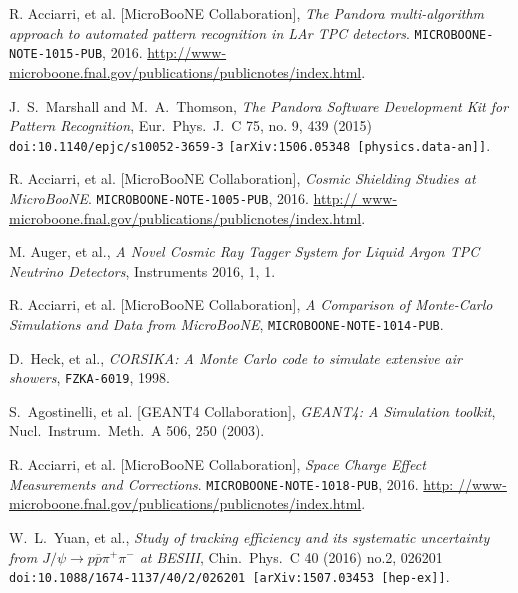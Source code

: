 \documentclass[a4paper]{scrartcl}
\begin{document}
\begin{thebibliography}{9}

   R. Acciarri, et al. [MicroBooNE Collaboration], \textit{The Pandora multi-algorithm approach to automated pattern recognition in LAr TPC detectors}. \texttt{MICROBOONE- NOTE-1015-PUB}, 2016. \url{http://www-microboone.fnal.gov/publications/publicnotes/index.html}.

   J.~S.~Marshall and M.~A.~Thomson, \textit{The Pandora Software Development Kit for Pattern Recognition}, Eur.\ Phys.\ J.\ C 75, no. 9, 439 (2015) \texttt{doi:10.1140/epjc/s10052-3659-3} \texttt{[arXiv:1506.05348 [physics.data-an]]}.

   R. Acciarri, et al. [MicroBooNE Collaboration], \textit{Cosmic Shielding Studies at MicroBooNE}. \texttt{MICROBOONE-NOTE-1005-PUB}, 2016. \url{http:// www-microboone.fnal.gov/publications/publicnotes/index.html}.

   M. Auger, et al., \textit{A Novel Cosmic Ray Tagger System for Liquid Argon TPC Neutrino Detectors}, Instruments 2016, 1, 1.

   R. Acciarri, et al. [MicroBooNE Collaboration], \textit{A Comparison of Monte-Carlo Simulations and Data from MicroBooNE}, \texttt{MICROBOONE-NOTE-1014-PUB}.

   D.~Heck, et al.,
  \textit{CORSIKA: A Monte Carlo code to simulate extensive air showers},
  \texttt{FZKA-6019}, 1998.

   S.~Agostinelli, et al. [GEANT4 Collaboration], \textit{GEANT4: A Simulation toolkit}, Nucl.\ Instrum.\ Meth.\ A {506}, 250 (2003).

   R. Acciarri, et al. [MicroBooNE Collaboration], \textit{Space Charge Effect Measurements and Corrections}. \texttt{MICROBOONE-NOTE-1018-PUB}, 2016. \url{http: //www-microboone.fnal.gov/publications/publicnotes/index.html}.

    W.~L.~Yuan, et al.,
    \textit{Study of tracking efficiency and its systematic uncertainty from $J/\psi \to p \overline{p} \pi^+ \pi^-$ at BESIII}, Chin.\ Phys.\ C 40 (2016) no.2,  026201 \texttt{doi:10.1088/1674-1137/40/2/026201 [arXiv:1507.03453 [hep-ex]]}.


\end{thebibliography}
\end{document}
